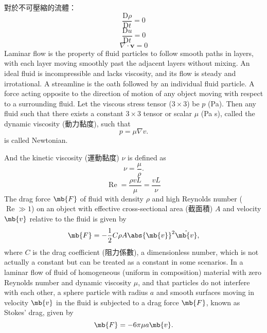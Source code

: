 \documentclass[a4paper,12pt]{article}
\begin{document}
對於不可壓縮的流體：
\[\frac{\mathrm{D}\rho}{\mathrm{D}t}=0\]
\[\frac{\mathrm{D}u}{\mathrm{D}t}=0\]
\[\nabla\cdot\mathbf{v}=0\]
Laminar flow is the property of fluid particles to follow smooth paths in layers, with each layer moving smoothly past the adjacent layers without mixing.
An ideal fluid is incompressible and lacks viscosity, and its flow is steady and irrotational.
A streamline is the oath followed by an individual fluid particle.
A force acting opposite to the direction of motion of any object moving with respect to a surrounding fluid.
Let the viscous stress tensor ($3\times 3$) be $p$ (Pa). Then any fluid such that there exists a constant $3\times 3$ tensor or scalar $\mu$ (Pa s), called the dynamic viscosity (動力黏度), such that
\[p=\mu\nabla v.\]
is called Newtonian.

And the kinetic viscosity (運動黏度) $\nu$ is defined as
\[\nu=\frac{\mu}{\rho}.\]
\[\operatorname{Re}=\frac{\rho v L}{\mu}=\frac{v L}{\nu}\]
The drag force $\mb{F}$ of fluid with density $\rho$ and high Reynolds number ($\operatorname{Re}\gg 1$) on an object with effective cross-sectional area (截面積) $A$ and velocity $\mb{v}$ relative to the fluid is given by
\[\mb{F}=-\frac{1}{2}C\rho A\abs{\mb{v}}^2\hat{\mb{v}},\]
where $C$ is the drag coefficient (阻力係數), a dimensionless number, which is not actually a constant but can be treated as a constant in some scenarios.
In a laminar flow of fluid of homogeneous (uniform in composition) material with zero Reynolds number and dynamic viscosity $\mu$, and that particles do not interfere with each other, a sphere particle with radius $a$ and smooth surfaces moving in velocity $\mb{v}$ in the fluid is subjected to a drag force $\mb{F}$, known as Stokes' drag, given by
\[\mb{F}=-6\pi\mu a\mb{v}.\]
\end{document}
